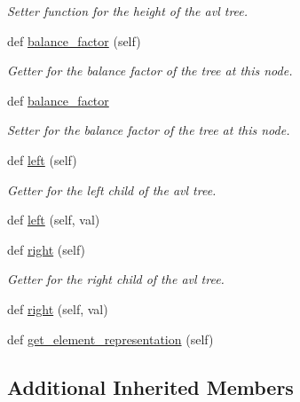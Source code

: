 \begin{DoxyCompactItemize}
\begin{DoxyCompactList}\small\item\em Setter function for the height of the avl tree. \end{DoxyCompactList}\item 
def \hyperlink{classbridges_1_1avl__tree__element_1_1_a_v_l_tree_element_a44085ad5195b41ab0f552db065e43c9d}{balance\+\_\+factor} (self)
\begin{DoxyCompactList}\small\item\em Getter for the balance factor of the tree at this node. \end{DoxyCompactList}\item 
def \hyperlink{classbridges_1_1avl__tree__element_1_1_a_v_l_tree_element_abc448bdf8e9e494e148a8b70dbd02cbf}{balance\+\_\+factor}
\begin{DoxyCompactList}\small\item\em Setter for the balance factor of the tree at this node. \end{DoxyCompactList}\item 
def \hyperlink{classbridges_1_1avl__tree__element_1_1_a_v_l_tree_element_a717696b26736f5c9585fefc7c5ab88f1}{left} (self)
\begin{DoxyCompactList}\small\item\em Getter for the left child of the avl tree. \end{DoxyCompactList}\item 
def \hyperlink{classbridges_1_1avl__tree__element_1_1_a_v_l_tree_element_aa60894585b83e7cb526d8c10eca75a59}{left} (self, val)
\item 
def \hyperlink{classbridges_1_1avl__tree__element_1_1_a_v_l_tree_element_aaab3b79617e7e503b1a7c28069d1eb15}{right} (self)
\begin{DoxyCompactList}\small\item\em Getter for the right child of the avl tree. \end{DoxyCompactList}\item 
def \hyperlink{classbridges_1_1avl__tree__element_1_1_a_v_l_tree_element_ad9b5962ea5c89c9b91d7767b1b258c8e}{right} (self, val)
\item 
def \hyperlink{classbridges_1_1avl__tree__element_1_1_a_v_l_tree_element_a9c5d7ae75ec92d6ff208b56ebba710ca}{get\+\_\+element\+\_\+representation} (self)
\end{DoxyCompactItemize}
\subsection*{Additional Inherited Members}


